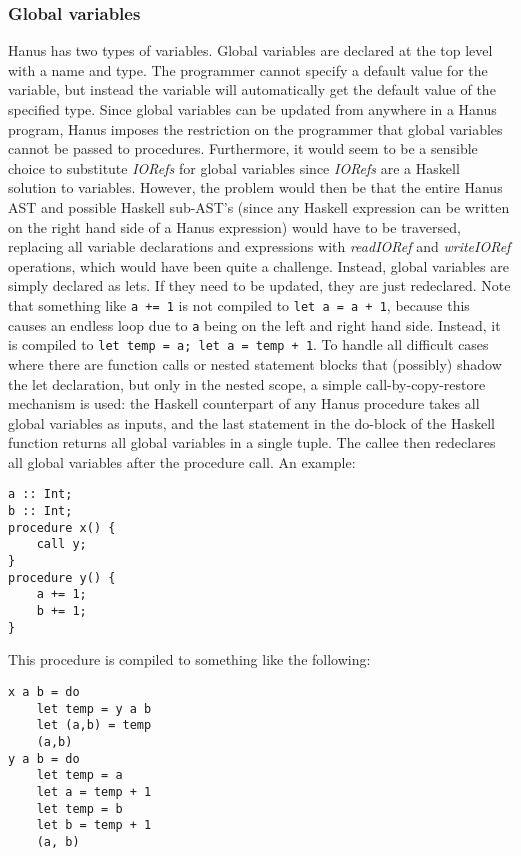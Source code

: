 \documentclass[12pt,a4paper]{article}
\newcommand{\inlinecode}[1]{\texttt{#1}}
\begin{document}
\subsubsection{Global variables}
Hanus has two types of variables. Global variables are declared at the top level with a name and type. The programmer cannot specify a default value for the variable, but instead the variable will automatically get the default value of the specified type. Since global variables can be updated from anywhere in a Hanus program, Hanus imposes the restriction on the programmer that global variables cannot be passed to procedures. Furthermore, it would seem to be a sensible choice to substitute \emph{IORefs} for global variables since \emph{IORefs} are a Haskell solution to variables. However, the problem would then be that the entire Hanus AST and possible Haskell sub-AST's (since any Haskell expression can be written on the right hand side of a Hanus expression) would have to be traversed, replacing all variable declarations and expressions with \emph{readIORef} and \emph{writeIORef} operations, which would have been quite a challenge. Instead, global variables are simply declared as lets. If they need to be updated, they are just redeclared. Note that something like \inlinecode{a += 1} is not compiled to \inlinecode{let a = a + 1}, because this causes an endless loop due to \inlinecode{a} being on the left and right hand side. Instead, it is compiled to \inlinecode{let temp = a; let a = temp + 1}. To handle all difficult cases where there are function calls or nested statement blocks that (possibly) shadow the let declaration, but only in the nested scope, a simple call-by-copy-restore mechanism is used: the Haskell counterpart of any Hanus procedure takes all global variables as inputs, and the last statement in the do-block of the Haskell function returns all global variables in a single tuple. The callee then redeclares all global variables after the procedure call. An example:
                        
\begin{verbatim}
a :: Int;
b :: Int;
procedure x() {
    call y;
}
procedure y() {
    a += 1;
    b += 1;
}
\end{verbatim}

\noindent This procedure is compiled to something like the following:

\begin{verbatim}
x a b = do
    let temp = y a b
    let (a,b) = temp
    (a,b)
y a b = do
    let temp = a
    let a = temp + 1
    let temp = b
    let b = temp + 1
    (a, b)
\end{verbatim}
\end{document}
